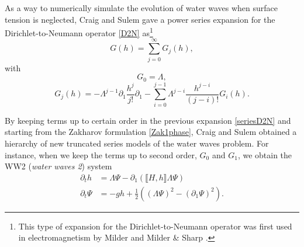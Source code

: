 \documentclass[11pt]{article}
\theoremstyle{plain}
\theoremstyle{definition}
\theoremstyle{definition}
\def\bp{{\partial_1}}
\def\comm#1#2{{\llbracket#1,#2\rrbracket}}
\begin{document}
As a way to numerically simulate the evolution of water waves when surface tension is neglected, Craig and Sulem \cite{CrSu1993}  gave
a  power series expansion for the Dirichlet-to-Neumann operator \eqref{D2N} as\footnote{This type of expansion for the Dirichlet-to-Neumann operator was first used in electromagnetism  by Milder \cite{milder1991improved} and Milder \& Sharp \cite{milder1992improved}.}
\begin{equation}\label{seriesD2N}
G(h)=\sum_{j=0}^\infty G_j(h),
\end{equation}
with
$$
G_0=\Lambda,
$$
$$
G_j(h)=-\Lambda^{j-1}\partial_1\frac{h^j}{j!}\partial_1-\sum_{i=0}^{j-1}\Lambda^{j-i}\frac{h^{j-i}}{(j-i)!}G_i(h).
$$

By keeping terms up to certain order in the previous expansion \eqref{seriesD2N} and starting from the Zakharov formulation \eqref{Zak1phase}, Craig and Sulem obtained a hierarchy of new truncated series models of the water waves problem. For instance, when we keep the terms up to second order, $G_0$ and $G_1$, we obtain the WW2 (\emph{water waves 2}) system
\begin{subequations}\label{CraigSulem}
\begin{alignat}{2}
\partial_t h&=\Lambda \Psi-\bp\left(\comm{H}{h}\Lambda\Psi\right)\\
\partial_t \Psi&= -g h+\frac{1}{2}\left((\Lambda\Psi)^2-(\bp \Psi)^2\right).
\end{alignat}
\end{subequations}
\end{document}
